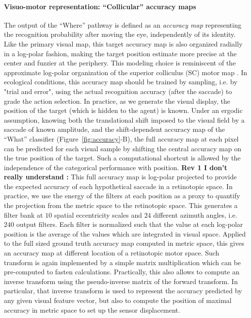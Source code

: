 \paragraph{Visuo-motor representation: ``Collicular'' accuracy maps}

The output of the ``Where'' pathway is defined as an \emph{accuracy map} representing the recognition probability after moving the eye, independently of its identity. Like the primary visual map, this target accuracy map is also organized radially in a log-polar fashion, making the target position estimate more precise at the center and fuzzier at the periphery. This modeling choice is reminiscent of the approximate log-polar organization of the superior colliculus (SC) motor map \cite{sparks1987sensory}. In ecological conditions, this accuracy map should be trained by sampling, i.e. by "trial and error", using the actual recognition accuracy (after the saccade) to grade the action selection. 
In practice, as we generate the visual display, the position of the target (which is hidden to the agent) is known. 
Under an ergodic assumption, knowing both the translational shift imposed to the visual field by a saccade of known amplitude, and the shift-dependent accuracy map of the  ``What'' classifier (Figure~\ref{fig:accuracy}-B), the full accuracy map at each pixel can be predicted for each visual sample by shifting the central accuracy map on the true position of the target. Such a computational shortcut is allowed by the independence of the categorical performance with position. %
{\color{magenta} \textbf{Rev 1 I don't really understand : }}{\color{blue} This full accuracy map is log-polar projected to provide the expected accuracy of each hypothetical saccade in a retinotopic space. In practice, we use the energy of the filters at each position as a proxy to quantify the projection from the metric space to the retinotopic space. This generates a filter bank at $10$ spatial eccentricity scales and $24$ different azimuth angles, i.e. $240$ output filters. Each filter is normalized such that the value at each log-polar position is the average of the values which are integrated in visual space. Applied to the full sized ground truth accuracy map computed in metric space, this gives an accuracy map at different location of a retinotopic motor space. Such transform is again implemented by a simple matrix multiplication which can be pre-computed to fasten calculations.} Practically, this also allows to compute an inverse transform using the pseudo-inverse matrix of the forward transform. In particular, that inverse transform is used to represent the accuracy predicted by any given visual feature vector, but also to compute the position of maximal accuracy in metric space to set up the sensor displacement.


